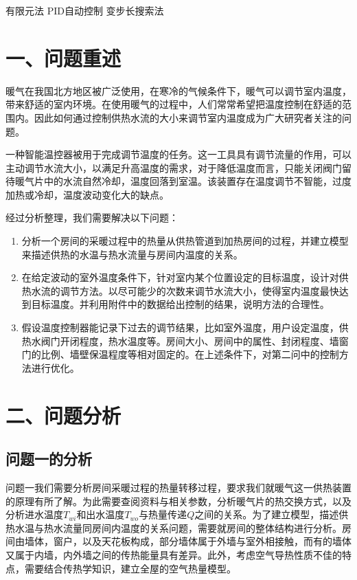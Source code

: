 \documentclass{my_paper}
\begin{document}
\begin{guanjianci}
  有限元法 \quad PID自动控制 \quad 变步长搜索法
\end{guanjianci}

\newpage
\section{一、问题重述}

暖气在我国北方地区被广泛使用，在寒冷的气候条件下，暖气可以调节室内温度，带来舒适的室内环境。在使用暖气的过程中，人们常常希望把温度控制在舒适的范围内。因此如何通过控制供热水流的大小来调节室内温度成为广大研究者关注的问题。

一种智能温控器被用于完成调节温度的任务。这一工具具有调节流量的作用，可以主动调节水流大小，以满足升高温度的需求，对于降低温度而言，只能关闭阀门留待暖气片中的水流自然冷却，温度回落到室温。该装置存在温度调节不智能，过度加热或冷却，温度波动变化大的缺点。

经过分析整理，我们需要解决以下问题：
\begin{enumerate}
    \item 分析一个房间的采暖过程中的热量从供热管道到加热房间的过程，并建立模型来描述供热的水温与热水流量与房间内温度的关系。
    \item 在给定波动的室外温度条件下，针对室内某个位置设定的目标温度，设计对供热水流的调节方法。以尽可能少的次数来调节水流大小，使得室内温度最快达到目标温度。并利用附件中的数据给出控制的结果，说明方法的合理性。
    \item 假设温度控制器能记录下过去的调节结果，比如室外温度，用户设定温度，供热水阀门开闭程度，热水温度等。房间大小、房间中的属性、封闭程度、墙窗门的比例、墙壁保温程度等相对固定的。在上述条件下，对第二问中的控制方法进行优化。
\end{enumerate}

\section{二、问题分析}
\subsection{问题一的分析}

问题一我们需要分析房间采暖过程的热量转移过程，要求我们就暖气这一供热装置的原理有所了解。为此需要查阅资料与相关参数，分析暖气片的热交换方式，以及分析进水温度$T_{wi}$和出水温度$ T_{wo} $与热量传递$Q$之间的关系。为了建立模型，描述供热水温与热水流量同房间内温度的关系问题，需要就房间的整体结构进行分析。房间由墙体，窗户，以及天花板构成，部分墙体属于外墙与室外相接触，而有的墙体又属于内墙，内外墙之间的传热能量具有差异。此外，考虑空气导热性质不佳的特点，需要结合传热学知识，建立全屋的空气热量模型。
\end{document}
